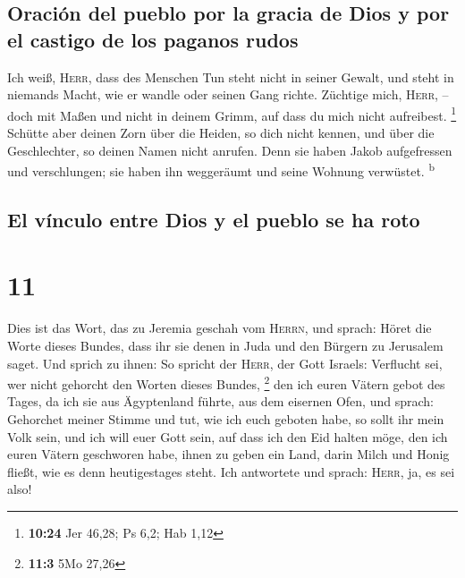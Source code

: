 \hypertarget{oraciuxf3n-del-pueblo-por-la-gracia-de-dios-y-por-el-castigo-de-los-paganos-rudos}{%
\subsection{Oración del pueblo por la gracia de Dios y por el castigo de
los paganos
rudos}\label{oraciuxf3n-del-pueblo-por-la-gracia-de-dios-y-por-el-castigo-de-los-paganos-rudos}}

 Ich weiß, \textsc{Herr}, dass des Menschen Tun steht
nicht in seiner Gewalt, und steht in niemands Macht, wie er wandle oder
seinen Gang richte.  Züchtige mich, \textsc{Herr}, --
doch mit Maßen und nicht in deinem Grimm, auf dass du mich nicht
aufreibest. \footnote{\textbf{10:24} Jer 46,28; Ps 6,2; Hab 1,12}
 Schütte aber deinen Zorn über die Heiden, so dich nicht
kennen, und über die Geschlechter, so deinen Namen nicht anrufen. Denn
sie haben Jakob aufgefressen und verschlungen; sie haben ihn weggeräumt
und seine Wohnung verwüstet. \textsuperscript{b}

\hypertarget{el-vuxednculo-entre-dios-y-el-pueblo-se-ha-roto}{%
\subsection{El vínculo entre Dios y el pueblo se ha
roto}\label{el-vuxednculo-entre-dios-y-el-pueblo-se-ha-roto}}

\hypertarget{section-10}{%
\section{11}\label{section-10}}

 Dies ist das Wort, das zu Jeremia geschah vom
\textsc{Herrn}, und sprach:  Höret die Worte dieses
Bundes, dass ihr sie denen in Juda und den Bürgern zu Jerusalem saget.
 Und sprich zu ihnen: So spricht der \textsc{Herr}, der
Gott Israels: Verflucht sei, wer nicht gehorcht den Worten dieses
Bundes, \footnote{\textbf{11:3} 5Mo 27,26}  den ich euren
Vätern gebot des Tages, da ich sie aus Ägyptenland führte, aus dem
eisernen Ofen, und sprach: Gehorchet meiner Stimme und tut, wie ich euch
geboten habe, so sollt ihr mein Volk sein, und ich will euer Gott sein,
 auf dass ich den Eid halten möge, den ich euren Vätern
geschworen habe, ihnen zu geben ein Land, darin Milch und Honig fließt,
wie es denn heutigestages steht. Ich antwortete und sprach:
\textsc{Herr}, ja, es sei also!


